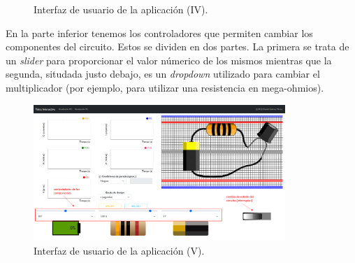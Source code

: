 \documentclass[../main.tex]{subfiles}
\begin{document}
\begin{figure}[!ht]
  \centering
  \quad


  \caption{Interfaz de usuario de la aplicación (IV).}
  \label{fig::interfaz-usuario4}

\end{figure}


En la parte inferior tenemos los controladores que permiten cambiar los componentes del circuito. Estos se dividen en dos partes. La primera se trata de un \textit{slider} para proporcionar el valor númerico de los mismos mientras que la segunda, situdada justo debajo, es un \textit{dropdown} utilizado para cambiar el multiplicador (por ejemplo, para utilizar una resistencia en mega-ohmios). \\ 

\begin{figure}[!ht]
  \centering
  \includegraphics[width=0.85\textwidth]{images/controladores.png}
  \caption{Interfaz de usuario de la aplicación (V).}
  \label{fig::interfaz-usuario5}
\end{figure}
\end{document}
